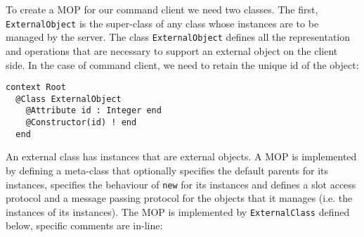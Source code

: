 \documentclass{article}
\begin{document}
To create a MOP for our command client we need two classes. The first, {\tt ExternalObject}
is the super-class of any class whose instances are to be managed by the server. The
class {\tt ExternalObject} defines all the representation and operations that are necessary
to support an external object on the client side. In the case of command client, we need
to retain the unique id of the object:
\begin{verbatim}
context Root
  @Class ExternalObject
    @Attribute id : Integer end
    @Constructor(id) ! end
  end
\end{verbatim}
An external class has instances that are external objects. A MOP is implemented by defining a
meta-class that optionally specifies the default parents for its instances, specifies the
behaviour of {\tt new} for its instances and defines a slot access protocol and a message passing
protocol for the objects that it manages (i.e. the instances of its instances). The MOP
is implemented by {\tt ExternalClass} defined below, specific comments are in-line: 
\end{document}
